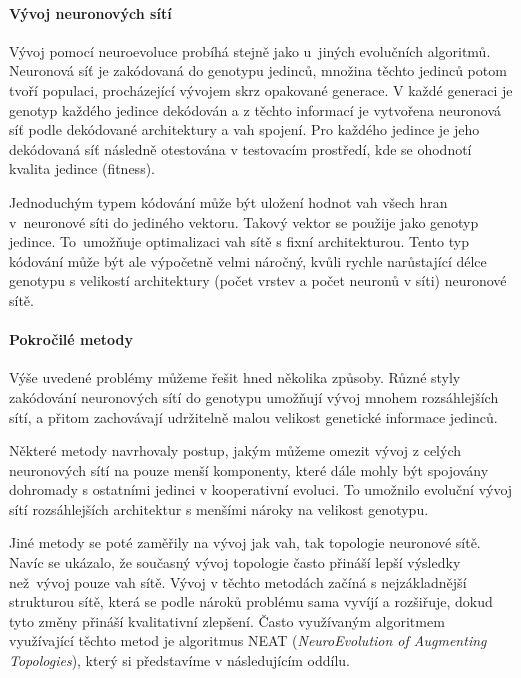 \paragraph{Vývoj neuronových sítí}
Vývoj pomocí neuroevoluce probíhá stejně jako u~jiných evolučních algoritmů.
Neuronová síť je zakódovaná do genotypu jedinců, množina těchto jedinců potom
tvoří populaci, procházející vývojem skrz opakované generace. V každé generaci
je genotyp každého jedince dekódován a z těchto informací je vytvořena
neuronová síť podle dekódované architektury a vah spojení. Pro každého jedince
je jeho dekódovaná síť následně otestována v testovacím prostředí, kde se
ohodnotí kvalita jedince (fitness).

Jednoduchým typem kódování může být uložení hodnot vah všech hran v~neuronové
síti do jediného vektoru. Takový vektor se použije jako genotyp jedince.
To~umožňuje optimalizaci vah sítě s fixní architekturou. Tento typ kódování
může být ale výpočetně velmi náročný, kvůli rychle narůstající délce genotypu s
velikostí architektury (počet vrstev a počet neuronů v síti) neuronové sítě.

\paragraph{Pokročilé metody}
Výše uvedené problémy můžeme řešit hned několika způsoby. Různé styly
zakódování neuronových sítí do genotypu umožňují vývoj mnohem
rozsáhlejších sítí, a přitom zachovávají udržitelně malou velikost genetické
informace jedinců. 

Některé metody \citet{gomez2008accelerated} navrhovaly postup, jakým můžeme
omezit vývoj z celých neuronových sítí na pouze menší komponenty, které dále
mohly být spojovány dohromady s ostatními jedinci v kooperativní evoluci. To
umožnilo evoluční vývoj sítí rozsáhlejších architektur s menšími nároky na
velikost genotypu.

Jiné metody se poté zaměřily na vývoj jak vah, tak topologie neuronové sítě.
Navíc se ukázalo, že současný vývoj topologie často přináší lepší výsledky
než~vývoj pouze vah sítě. Vývoj v těchto metodách začíná s nejzákladnější
strukturou sítě, která se podle nároků problému sama vyvíjí a rozšiřuje, dokud
tyto změny přináší kvalitativní zlepšení. Často využívaným algoritmem
využívající těchto metod je algoritmus NEAT (\emph{NeuroEvolution of Augmenting
Topologies}), který si představíme v následujícím oddílu.

